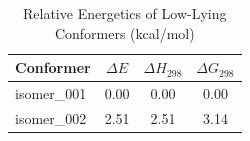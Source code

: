 \begin{table}[h]
\centering
\caption{Relative Energetics of Low-Lying Conformers (kcal/mol)}
\begin{tabular}{lccc}
\toprule
Conformer & $\Delta E$ & $\Delta H_{298}$ & $\Delta G_{298}$ \\
\midrule
isomer_001 &   0.00 &   0.00 &   0.00 \\
isomer_002 &   2.51 &   2.51 &   3.14 \\
\bottomrule
\end{tabular}
\end{table}